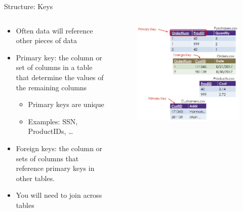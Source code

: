 \documentclass[aspectratio=169]{../latex_main/tntbeamer}  %
\begin{document}
	
	
	\begin{frame}{Structure: Keys}

	 \begin{columns}
	   
	   
	   \begin{column}{.4\textwidth}
	    \begin{itemize}
	        \item Often data will reference other pieces of data
	        \item Primary key: the column or set of columns in a table that determine the values of the remaining columns
	        \begin{itemize}
	            \item Primary keys are unique
	            \item Examples: SSN, ProductIDs, …
	        \end{itemize}
	        \item Foreign keys: the column or sets of columns that reference primary keys in other tables.
	        \item You will need to join across tables
	    \end{itemize}
		\end{column}
		
	   \begin{column}{.6\textwidth}
	   \begin{figure}
	       		    \includegraphics[scale=.28]{Bild15}
	   \end{figure}

		\end{column}
		\end{columns}
	\end{frame}
	
\end{document}
